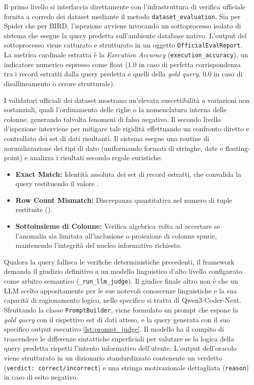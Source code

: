 Il primo livello si interfaccia direttamente con l'infrastruttura di
verifica ufficiale fornita a corredo dei dataset mediante il metodo
\texttt{dataset\_evaluation}. Sia per Spider che per BIRD, l'ispezione
avviene invocando un sottoprocesso isolato di sistema che esegue la
query predetta sull'ambiente database nativo. L'output del sottoprocesso
viene catturato e strutturato in un oggetto \texttt{OfficialEvalReport}.
La metrica cardinale estratta è la \emph{Execution Accuracy}
(\texttt{execution\_accuracy}), un indicatore numerico espresso come
float (\(1.0\) in caso di perfetta corrispondenza tra i record estratti
dalla query predetta e quelli della \emph{gold query}, \(0.0\) in caso
di disallineamento o errore strutturale).

I validatori ufficiali dei dataset mostrano un'elevata suscettibilità a
variazioni non sostanziali, quali l'ordinamento delle righe o la
nomenclatura interna delle colonne, generando talvolta fenomeni di falso
negativo. Il secondo livello d'ispezione interviene per mitigare tale
rigidità effettuando un confronto diretto e controllato dei set di dati
risultanti. Il sistema esegue una routine di normalizzazione dei tipi di
dato (uniformando formati di stringhe, date e floating-point) e analizza
i risultati secondo regole euristiche:

\begin{itemize}
\item
  \textbf{Exact Match:} Identità assoluta dei set di record estratti,
  che convalida la query restituendo il valore
  .
\item
  \textbf{Row Count Mismatch:} Discrepanza quantitativa nel numero di
  tuple restituite ().
\item
  \textbf{Sottoinsieme di Colonne:} Verifica algebrica volta ad
  accertare se l'anomalia sia limitata all'inclusione o proiezione di
  colonne spurie, mantenendo l'integrità del nucleo informativo
  richiesto.
\end{itemize}

Qualora la query fallisca le verifiche deterministiche precedenti, il
framework demanda il giudizio definitivo a un modello linguistico d'alto
livello configurato come arbitro semantico (\texttt{\_run\_llm\_judge}).
Il giudice finale altro non è che un LLM scelto appositamente per le sue 
notevoli conoscenze linguistiche e la sua capacità di ragionamento logico, 
nello specifico si tratta di Qwen3-Coder-Next.
Sfruttando la classe \texttt{PromptBuilder}, viene formulato un prompt
che espone la \emph{gold query} con il rispettivo set di dati atteso, e
la query generata con il suo specifico output esecutivo \ref{lst:prompt_judge}. Il modello ha
il compito di trascendere le differenze sintattiche superficiali per
valutare se la logica della query predetta rispetti l'intento
informativo dell'utente. L'output dell'oracolo viene strutturato in un
dizionario standardizzato contenente un verdetto
(\texttt{verdict:~correct/incorrect}) e una stringa motivazionale
dettagliata (\texttt{reason}) in caso di esito negativo.

